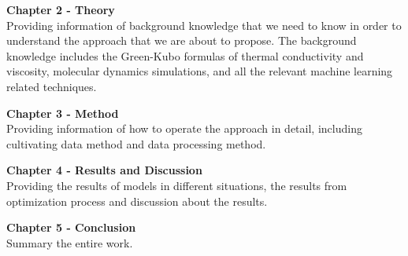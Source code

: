 \textbf{Chapter 2 - Theory} 
\\Providing information of background knowledge that we need 
to know in order to understand the approach that we are about to propose. 
The background knowledge includes the Green-Kubo formulas of thermal 
conductivity and viscosity, molecular dynamics simulations, and all the 
relevant machine learning related techniques.

\textbf{Chapter 3 - Method} 
\\Providing information of how to operate the approach in 
detail, including cultivating data method and data processing method.

\textbf{Chapter 4 - Results and Discussion} 
\\Providing the results of models 
in different situations, the results from optimization process and discussion 
about the results.

\textbf{Chapter 5 - Conclusion} 
\\Summary the entire work.